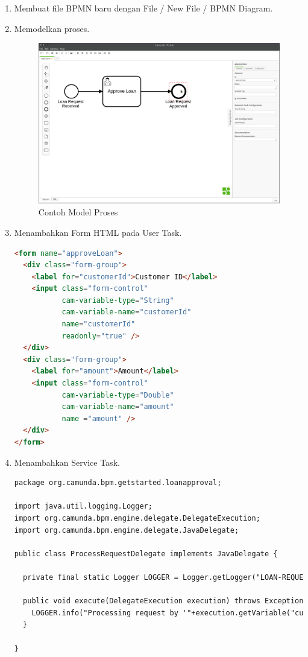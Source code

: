	\begin{enumerate}
		\item Membuat file BPMN baru dengan File / New File / BPMN Diagram.
		\item Memodelkan proses.
				\begin{figure}[H]
			\centering
			\includegraphics[scale=0.5]{Gambar/Bab-2/bpmn/bpmn}
			\caption{Contoh Model Proses} 
			\label{fig:modelproses}
		\end{figure}
		\item Menambahkan Form HTML pada User Task.
		\begin{lstlisting}[language=html,basicstyle=\tiny,caption=Contoh Task Form]
		<form name="approveLoan">
  <div class="form-group">
    <label for="customerId">Customer ID</label>
    <input class="form-control"
           cam-variable-type="String"
           cam-variable-name="customerId"
           name="customerId"
           readonly="true" />
  </div>
  <div class="form-group">
    <label for="amount">Amount</label>
    <input class="form-control"
           cam-variable-type="Double"
           cam-variable-name="amount"
           name ="amount" />
  </div>
</form>
\end{lstlisting}
		\item Menambahkan Service Task.
		\begin{lstlisting}[language=html,basicstyle=\tiny,caption=Contoh Implementasi Service Task]
		package org.camunda.bpm.getstarted.loanapproval;

import java.util.logging.Logger;
import org.camunda.bpm.engine.delegate.DelegateExecution;
import org.camunda.bpm.engine.delegate.JavaDelegate;

public class ProcessRequestDelegate implements JavaDelegate {

  private final static Logger LOGGER = Logger.getLogger("LOAN-REQUESTS");

  public void execute(DelegateExecution execution) throws Exception {
    LOGGER.info("Processing request by '"+execution.getVariable("customerId")+"'...");
  }

}
		\end{lstlisting}
	\end{enumerate}
	

